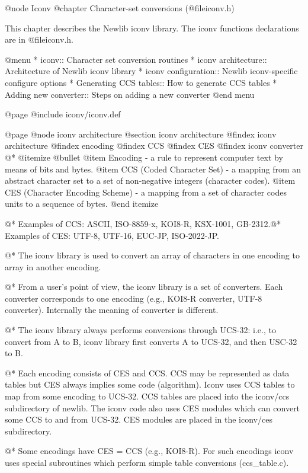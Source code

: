 @node Iconv
@chapter Character-set conversions (@file{iconv.h})

This chapter describes the Newlib iconv library.
The iconv functions declarations are in
@file{iconv.h}.

@menu
* iconv::                 Character set conversion routines
* iconv architecture::    Architecture of Newlib iconv library
* iconv configuration::   Newlib iconv-specific configure options
* Generating CCS tables:: How to generate CCS tables
* Adding new converter::  Steps on adding a new converter
@end menu

@page
@include iconv/iconv.def

@page
@node iconv architecture
@section iconv architecture
@findex iconv architecture
@findex encoding
@findex CCS
@findex CES
@findex iconv converter
@*
@itemize @bullet
@item
Encoding - a rule to represent computer text by means of bits and bytes.
@item
CCS (Coded Character Set) - a mapping from an abstract character set
to a set of non-negative integers (character codes).
@item
CES (Character Encoding Scheme) - a mapping from a set of character codes
units to a sequence of bytes.
@end itemize

@*
Examples of CCS: ASCII, ISO-8859-x, KOI8-R, KSX-1001, GB-2312.@*
Examples of CES: UTF-8, UTF-16, EUC-JP, ISO-2022-JP.

@*
The iconv library is used to convert an array of characters in one encoding
to array in another encoding.

@*
From a user's point of view, the iconv library is a set of converters. Each converter
corresponds to one encoding (e.g., KOI8-R converter, UTF-8 converter).
Internally the meaning of converter is different.

@*
The iconv library always performs conversions through UCS-32: i.e., to convert
from A to B, iconv library first converts A to UCS-32, and then USC-32 to B.

@*
Each encoding consists of CES and CCS. CCS may be represented as data tables
but CES always implies some code (algorithm). Iconv uses CCS tables 
to map from some encoding to UCS-32. CCS tables are placed into
the iconv/ccs subdirectory of newlib.  The iconv code also uses CES 
modules which can convert some CCS to and from UCS-32.  CES modules are placed 
in the iconv/ces subdirectory.

@*
Some encodings have CES = CCS (e.g., KOI8-R). For such encodings iconv uses
special subroutines which perform simple table conversions (ccs_table.c).

